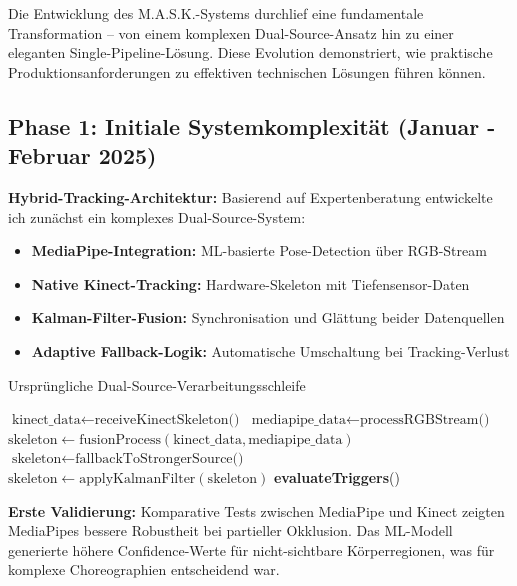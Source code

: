 Die Entwicklung des M.A.S.K.-Systems durchlief eine fundamentale Transformation – von einem komplexen Dual-Source-Ansatz hin zu einer eleganten Single-Pipeline-Lösung. Diese Evolution demonstriert, wie praktische Produktionsanforderungen zu effektiven technischen Lösungen führen können.

\subsection{Phase 1: Initiale Systemkomplexität (Januar - Februar 2025)}

\textbf{Hybrid-Tracking-Architektur:}
Basierend auf Expertenberatung entwickelte ich zunächst ein komplexes Dual-Source-System:
\begin{itemize}
    \item \textbf{MediaPipe-Integration:} ML-basierte Pose-Detection über RGB-Stream
    \item \textbf{Native Kinect-Tracking:} Hardware-Skeleton mit Tiefensensor-Daten
    \item \textbf{Kalman-Filter-Fusion:} Synchronisation und Glättung beider Datenquellen
    \item \textbf{Adaptive Fallback-Logik:} Automatische Umschaltung bei Tracking-Verlust
\end{itemize}

\begin{algorithm}[H]
\caption{Ursprüngliche Dual-Source-Verarbeitungsschleife}
\begin{algorithmic}[1]
    \State $\text{kinect\_data} \leftarrow \text{receiveKinectSkeleton()}$
    \State $\text{mediapipe\_data} \leftarrow \text{processRGBStream()}$
        \State $\text{skeleton} \leftarrow \text{fusionProcess}(\text{kinect\_data}, \text{mediapipe\_data})$
    \Else
        \State $\text{skeleton} \leftarrow \text{fallbackToStrongerSource()}$
    \EndIf
    \State $\text{skeleton} \leftarrow \text{applyKalmanFilter}(\text{skeleton})$
    \State \textbf{evaluateTriggers}()
\end{algorithmic}
\end{algorithm}

\textbf{Erste Validierung:}
Komparative Tests zwischen MediaPipe und Kinect zeigten MediaPipes bessere Robustheit bei partieller Okklusion. Das ML-Modell generierte höhere Confidence-Werte für nicht-sichtbare Körperregionen, was für komplexe Choreographien entscheidend war.

